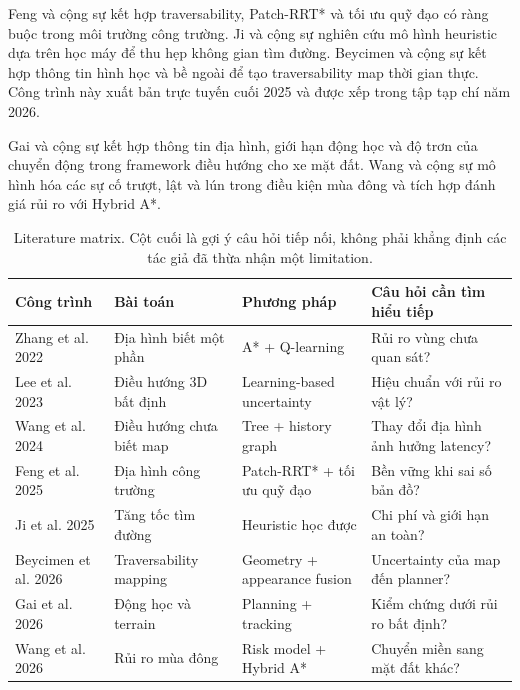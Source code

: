 \documentclass[11pt,a4paper]{article}
\begin{document}
Feng và cộng sự \cite{feng2025constraint} kết hợp traversability,
Patch-RRT* và tối ưu quỹ đạo có ràng buộc trong môi trường công trường.
Ji và cộng sự \cite{ji2025nnpp} nghiên cứu mô hình heuristic dựa trên học máy
để thu hẹp không gian tìm đường. Beycimen và cộng sự
\cite{beycimen2026fusion} kết hợp thông tin hình học và bề ngoài
để tạo traversability map thời gian thực. Công trình này
xuất bản trực tuyến cuối 2025 và được xếp trong tập tạp chí năm 2026.

Gai và cộng sự \cite{gai2026framework} kết hợp thông tin địa hình,
giới hạn động học và độ trơn của chuyển động trong framework
điều hướng cho xe mặt đất. Wang và cộng sự \cite{wang2026winter}
mô hình hóa các sự cố trượt, lật và lún trong điều kiện mùa đông
và tích hợp đánh giá rủi ro với Hybrid A*.

\begin{table}[p]
\centering\footnotesize
\caption{Literature matrix. Cột cuối là gợi ý câu hỏi tiếp nối,
không phải khẳng định các tác giả đã thừa nhận một limitation.}
\label{tab:lit}
\begin{tabularx}{\textwidth}{@{}p{2.25cm}p{2.7cm}p{3.05cm}Y@{}}
\toprule
Công trình & Bài toán & Phương pháp & Câu hỏi cần tìm hiểu tiếp \\
\midrule
Zhang et al. 2022 \cite{zhang2022wheeled}
& Địa hình biết một phần & A* + Q-learning & Rủi ro vùng chưa quan sát?\\
Lee et al. 2023 \cite{lee2023uncertainty}
& Điều hướng 3D bất định & Learning-based uncertainty & Hiệu chuẩn với rủi ro vật lý?\\
Wang et al. 2024 \cite{wang2024history}
& Điều hướng chưa biết map & Tree + history graph & Thay đổi địa hình ảnh hưởng latency?\\
Feng et al. 2025 \cite{feng2025constraint}
& Địa hình công trường & Patch-RRT* + tối ưu quỹ đạo & Bền vững khi sai số bản đồ?\\
Ji et al. 2025 \cite{ji2025nnpp}
& Tăng tốc tìm đường & Heuristic học được & Chi phí và giới hạn an toàn?\\
Beycimen et al. 2026 \cite{beycimen2026fusion}
& Traversability mapping & Geometry + appearance fusion & Uncertainty của map đến planner?\\
Gai et al. 2026 \cite{gai2026framework}
& Động học và terrain & Planning + tracking & Kiểm chứng dưới rủi ro bất định?\\
Wang et al. 2026 \cite{wang2026winter}
& Rủi ro mùa đông & Risk model + Hybrid A* & Chuyển miền sang mặt đất khác?\\
\bottomrule
\end{tabularx}
\end{table}
\end{document}
